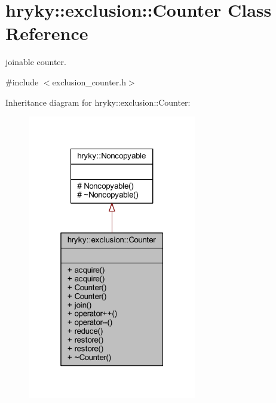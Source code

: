 \hypertarget{classhryky_1_1exclusion_1_1_counter}{\section{hryky\-:\-:exclusion\-:\-:Counter Class Reference}
\label{classhryky_1_1exclusion_1_1_counter}
}


joinable counter.  




{\ttfamily \#include $<$exclusion\-\_\-counter.\-h$>$}



Inheritance diagram for hryky\-:\-:exclusion\-:\-:Counter\-:
\nopagebreak
\begin{figure}[H]
\begin{center}
\leavevmode
\includegraphics[width=208pt]{classhryky_1_1exclusion_1_1_counter__inherit__graph}
\end{center}
\end{figure}
